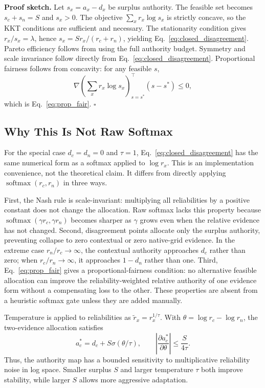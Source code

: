 \documentclass[10pt,twocolumn]{article}
\begin{document}
\noindent\textbf{Proof sketch.}
Let $s_x=a_x-d_x$ be surplus authority. The feasible set becomes $s_c+s_n=S$ and $s_x>0$. The objective $\sum_x r_x\log s_x$ is strictly concave, so the KKT conditions are sufficient and necessary. The stationarity condition gives $r_x/s_x=\lambda$, hence $s_x=S r_x/(r_c+r_n)$, yielding Eq.~\eqref{eq:closed_disagreement}. Pareto efficiency follows from using the full authority budget. Symmetry and scale invariance follow directly from Eq.~\eqref{eq:closed_disagreement}. Proportional fairness follows from concavity: for any feasible $s$,
\begin{equation}
    \nabla\left(\sum_x r_x\log s_x\right)_{s=s^*}^{\top}(s-s^*)\leq 0,
\end{equation}
which is Eq.~\eqref{eq:prop_fair}. \hfill $\square$

\subsection{Why This Is Not Raw Softmax}

For the special case $d_c=d_n=0$ and $\tau=1$, Eq.~\eqref{eq:closed_disagreement} has the same numerical form as a softmax applied to $\log r_x$. This is an implementation convenience, not the theoretical claim. It differs from directly applying $\operatorname{softmax}(r_c,r_n)$ in three ways.

First, the Nash rule is scale-invariant: multiplying all reliabilities by a positive constant does not change the allocation. Raw softmax lacks this property because $\operatorname{softmax}(\gamma r_c,\gamma r_n)$ becomes sharper as $\gamma$ grows even when the relative evidence has not changed. Second, disagreement points allocate only the surplus authority, preventing collapse to zero contextual or zero native-grid evidence. In the extreme case $r_n/r_c\to\infty$, the contextual authority approaches $d_c$ rather than zero; when $r_c/r_n\to\infty$, it approaches $1-d_n$ rather than one. Third, Eq.~\eqref{eq:prop_fair} gives a proportional-fairness condition: no alternative feasible allocation can improve the reliability-weighted relative authority of one evidence form without a compensating loss to the other. These properties are absent from a heuristic softmax gate unless they are added manually.

Temperature is applied to reliabilities as $\tilde r_x=r_x^{1/\tau}$. With $\theta=\log r_c-\log r_n$, the two-evidence allocation satisfies
\begin{equation}
    a_c^*=d_c+S\sigma(\theta/\tau),\qquad
    \left|
    \frac{\partial a_c^*}{\partial \theta}
    \right|
    \leq
    \frac{S}{4\tau}.
    \label{eq:stability}
\end{equation}
Thus, the authority map has a bounded sensitivity to multiplicative reliability noise in log space. Smaller surplus $S$ and larger temperature $\tau$ both improve stability, while larger $S$ allows more aggressive adaptation.
\end{document}
